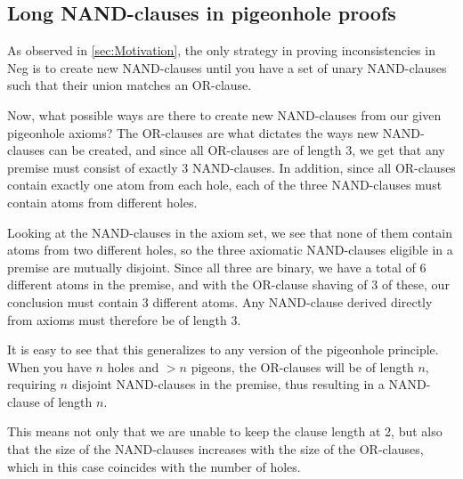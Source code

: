 \subsection{Long NAND-clauses in pigeonhole proofs}
\label{sub:Long NAND-clauses in pigeonhole proofs}
As observed in \ref{sec:Motivation}, the only strategy in proving inconsistencies in Neg is to create new NAND-clauses until you have a set of unary NAND-clauses such that their union matches an OR-clause.

Now, what possible ways are there to create new NAND-clauses from our given pigeonhole axioms?
The OR-clauses are what dictates the ways new NAND-clauses can be created, and since all OR-clauses are of length 3, we get that any premise must consist of exactly 3 NAND-clauses.
In addition, since all OR-clauses contain exactly one atom from each hole, each of the three NAND-clauses must contain atoms from different holes.

Looking at the NAND-clauses in the axiom set, we see that none of them contain atoms from two different holes, so the three axiomatic NAND-clauses eligible in a premise are mutually disjoint.
Since all three are binary, we have a total of 6 different atoms in the premise, and with the OR-clause shaving of 3 of these, our conclusion must contain 3 different atoms.
Any NAND-clause derived directly from axioms must therefore be of length 3.\par
\begin{figure}[!h]
  \centering
  \begin{prooftree*}
  \end{prooftree*}
  \caption{}
  \label{fig:pigeonhole_not_binary}
\end{figure}
It is easy to see that this generalizes to any version of the pigeonhole principle.
When you have $n$ holes and $>n$ pigeons, the OR-clauses will be of length $n$, requiring $n$ disjoint NAND-clauses in the premise, thus resulting in a NAND-clause of length $n$.

This means not only that we are unable to keep the clause length at 2, but also that the size of the NAND-clauses increases with the size of the OR-clauses, which in this case coincides with the number of holes.
